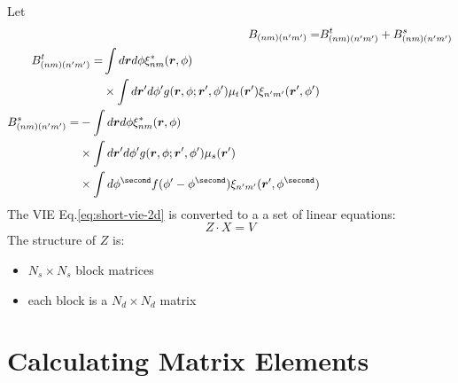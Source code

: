 \documentclass [10pt,letterpaper]{article}
\begin{document}
Let
\begin{subequations} \label{eq:def-B-Bt-Bs}
\begin{align}
	B_{(n m)(n^\prime m^\prime)}
	=& 
	B^t_{(n m)(n^\prime m^\prime)}
	+B^s_{(n m)(n^\prime m^\prime)}
	\\
	\begin{split}
		B^t_{(n m)(n^\prime m^\prime)}
		=&
		\int d\vectorsym{r}d\phi
		\xi^*_{n m}(\vectorsym{r},\phi)
		\\
		&\times
		\int d\vectorsym{r}^\prime d\phi^\prime
		g(\vectorsym{r},\phi;\vectorsym{r}^\prime,\phi^\prime)
		\mu_t(\vectorsym{r}^\prime)
		\xi_{n^\prime m^\prime}
		(\vectorsym{r}^\prime,\phi^\prime)
	\end{split}
	\\
	\begin{split}
		B^s_{(n m)(n^\prime m^\prime)}
		=&
		-\int d\vectorsym{r}d\phi
		\xi^*_{n m}(\vectorsym{r},\phi)
		\\
		&\times
		\int d\vectorsym{r}^\prime d\phi^\prime
		g(\vectorsym{r},\phi;\vectorsym{r}^\prime,\phi^\prime)
		\mu_s(\vectorsym{r}^\prime)
		\\
		&\times
		\int d\phi^\second
		f(\phi^\prime-\phi^\second)
		\xi_{n^\prime m^\prime}
		(\vectorsym{r}^\prime,\phi^\second) 
	\end{split}
\end{align}
\end{subequations}
The VIE Eq.\eqref{eq:short-vie-2d} is converted to a a set of linear equations:
\begin{equation} \label{eq:Z-X-V}
	Z\cdot X=V
\end{equation}
The structure of $Z$ is:
\begin{itemize}
	\item $N_s\times N_s$ block matrices
	\item each block is a $N_d\times N_d$ matrix
\end{itemize}




\section{Calculating Matrix Elements}
\label{sec:calculate-matrix-elements}
\end{document}
